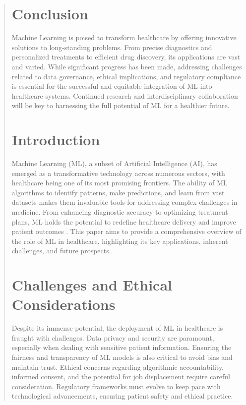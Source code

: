 \documentclass[11pt,a4paper]{article}
\begin{document}
\begin{abstract}
\section{Conclusion}
Machine Learning is poised to transform healthcare by offering innovative solutions to long-standing problems. From precise diagnostics and personalized treatments to efficient drug discovery, its applications are vast and varied. While significant progress has been made, addressing challenges related to data governance, ethical implications, and regulatory compliance is essential for the successful and equitable integration of ML into healthcare systems. Continued research and interdisciplinary collaboration will be key to harnessing the full potential of ML for a healthier future.\printbibliography

\section{Introduction}
Machine Learning (ML), a subset of Artificial Intelligence (AI), has emerged as a transformative technology across numerous sectors, with healthcare being one of its most promising frontiers. The ability of ML algorithms to identify patterns, make predictions, and learn from vast datasets makes them invaluable tools for addressing complex challenges in medicine. From enhancing diagnostic accuracy to optimizing treatment plans, ML holds the potential to redefine healthcare delivery and improve patient outcomes \cite{Smith2020}. This paper aims to provide a comprehensive overview of the role of ML in healthcare, highlighting its key applications, inherent challenges, and future prospects.

\section{Challenges and Ethical Considerations}
Despite its immense potential, the deployment of ML in healthcare is fraught with challenges. Data privacy and security are paramount, especially when dealing with sensitive patient information. Ensuring the fairness and transparency of ML models is also critical to avoid bias and maintain trust. Ethical concerns regarding algorithmic accountability, informed consent, and the potential for job displacement require careful consideration. Regulatory frameworks must evolve to keep pace with technological advancements, ensuring patient safety and ethical practice.


\end{abstract}
\end{document}
